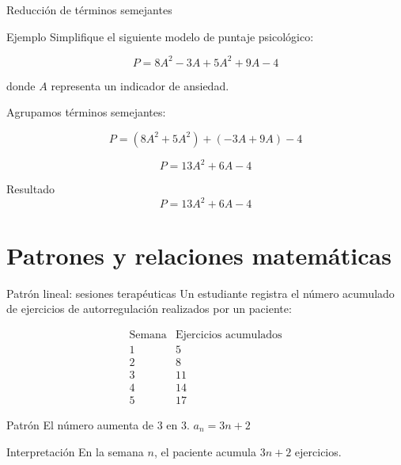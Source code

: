 \documentclass[handout,aspectratio=169]{beamer}
\begin{document}
	
	\begin{frame}{Reducción de términos semejantes}
		\begin{exampleblock}{Ejemplo}
			Simplifique el siguiente modelo de puntaje psicológico:
			
			\[
			P=8A^2-3A+5A^2+9A-4
			\]
			
			donde \(A\) representa un indicador de ansiedad.
		\end{exampleblock}
		
		\pause
		
		Agrupamos términos semejantes:
		
		\[
		P=(8A^2+5A^2)+(-3A+9A)-4
		\]
		
		\pause
		
		\[
		P=13A^2+6A-4
		\]
		
		\pause
		
		\begin{block}{Resultado}
			\[
			P=13A^2+6A-4
			\]
		\end{block}
	\end{frame}
	
	\section{Patrones y relaciones matemáticas}
	
	\begin{frame}{Patrón lineal: sesiones terapéuticas}
		Un estudiante registra el número acumulado de ejercicios de autorregulación realizados por un paciente:
		
		\[
		\begin{array}{c|c}
			\text{Semana} & \text{Ejercicios acumulados} \\
			\hline
			1 & 5 \\
			2 & 8 \\
			3 & 11 \\
			4 & 14 \\
			5 & 17
		\end{array}
		\]
		
		\pause
		
		\begin{block}{Patrón}
			El número aumenta de \(3\) en \(3\). \qquad  $a_n=3n+2$
		\end{block}
		
		\pause
		
		\begin{block}{Interpretación}
			En la semana \(n\), el paciente acumula \(3n+2\) ejercicios.
		\end{block}
	\end{frame}
	
\end{document}
